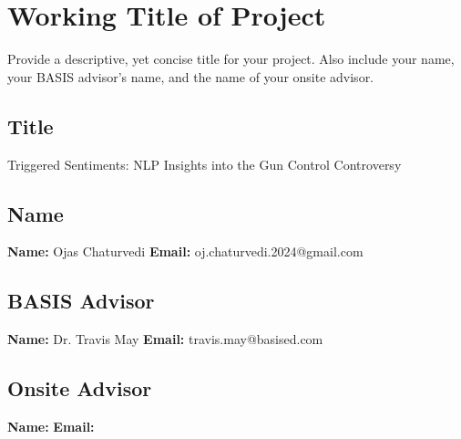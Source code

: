 
\section[Working Title of Project]{Working Title of Project}

Provide a descriptive, yet concise title for your project. Also include your name, your BASIS advisor's name, and the name of your onsite advisor.

\subsection{Title}
Triggered Sentiments: NLP Insights into the Gun Control Controversy

\subsection{Name}
\textbf{Name:} Ojas Chaturvedi
\newline
\textbf{Email: } oj.chaturvedi.2024@gmail.com

\subsection{BASIS Advisor}
\textbf{Name:} Dr. Travis May
\newline
\textbf{Email: } travis.may@basised.com

\subsection{Onsite Advisor}
\textbf{Name:}
\newline
\textbf{Email: }
